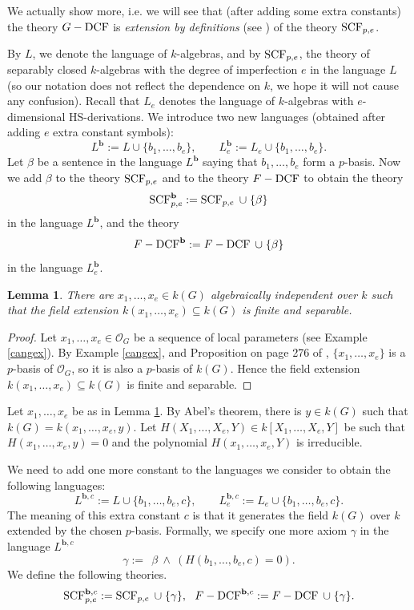 \documentclass[10pt]{amsart}
\newtheorem{lemma}[theorem]{Lemma}
\theoremstyle{definition}
\begin{document}
We actually show more, i.e. we will see that (after adding some extra constants) the theory $G-\operatorname{DCF}$ is \emph{extension by definitions} (see \cite[page 59]{shologic}) of the theory $\operatorname{SCF}_{p,e}$.

By $L$, we denote the language of $k$-algebras, and by $\operatorname{SCF}_{p,e}$, the theory of separably closed $k$-algebras with the degree of imperfection $e$
in the language $L$ (so our notation does not reflect the dependence on $k$, we hope it will not cause any confusion). Recall that $L_e$ denotes the language of $k$-algebras with $e$-dimensional HS-derivations. We introduce two new languages (obtained after adding $e$ extra constant symbols):
$$L^{\mathbf{b}}:=L\cup\lbrace b_1,\ldots,b_e\rbrace,\qquad L_e^{\mathbf{b}}:=L_e\cup\lbrace b_1,\ldots,b_e\rbrace.$$
Let $\beta$ be a sentence in the language $L^{\mathbf{b}}$ saying that $b_1,\ldots,b_e$ form a $p$-basis.
Now we add $\beta$ to the theory $\operatorname{SCF}_{p,e}$ and to the theory $F-\operatorname{DCF}$ to obtain the theory
$$\operatorname{SCF}_{p,e}^{\mathbf{b}}:=\operatorname{SCF}_{p,e}\;\cup\;\lbrace\beta\rbrace$$
in the language $L^{\mathbf{b}}$, and the theory
$$F-\operatorname{DCF}^{\mathbf{b}}:=F-\operatorname{DCF}\;\cup\;\lbrace\beta\rbrace$$
in the language $L_e^{\mathbf{b}}$.
\begin{lemma}\label{finsep}
There are $x_1,\ldots,x_e\in k(G)$ algebraically independent over $k$ such that the field extension $k(x_1,\ldots,x_e)\subseteq k(G)$ is finite and separable. %
\end{lemma}
\begin{proof}
Let $x_1,\ldots,x_e\in \mathcal{O}_G$ be a sequence of local parameters (see Example \ref{cangex}). By Example \ref{cangex}, \cite[30.6(ii)]{mat} and Proposition on page 276 of \cite{mat0}, $\{x_1,\ldots,x_e\}$ is a $p$-basis of $\mathcal{O}_G$, so it is also a $p$-basis of $k(G)$. Hence the field extension $k(x_1,\ldots,x_e)\subseteq k(G)$ is finite and separable.
\end{proof}
Let $x_1,\ldots,x_e$ be as in Lemma \ref{finsep}. By Abel's theorem, there is $y\in k(G)$ such that $k(G)=k(x_1,\ldots,x_e,y)$. Let $H(X_1,\ldots,X_e,Y)\in k[X_1,\ldots,X_e,Y]$ be such that $H(x_1,\ldots,x_e,y)=0$ and the polynomial $H(x_1,\ldots,x_e,Y)$ is irreducible.

We need to add one more constant to the languages we consider to obtain the following languages:
$$L^{{\mathbf{b}},c}:=L\cup\lbrace b_1,\ldots,b_e,c\rbrace,\qquad L_e^{{\mathbf{b}},c}:=L_e\cup\lbrace b_1,\ldots,b_e,c\rbrace.$$
The meaning of this extra constant $c$ is that it generates the field $k(G)$ over $k$ extended by the chosen $p$-basis.
Formally, we specify one more axiom $\gamma$ in the language $L^{{\mathbf{b}},c}$  
$$\gamma:=\ \ \beta \ \wedge  \ (H(b_1,\ldots,b_e,c)=0).$$
We define the following theories.
$$\operatorname{SCF}_{p,e}^{{\mathbf{b}},c}:=\operatorname{SCF}_{p,e}\;\cup\;\lbrace \gamma\rbrace,\ \ F-\operatorname{DCF}^{{\mathbf{b}},c}:=F-\operatorname{DCF}\;\cup\;\lbrace \gamma\rbrace .$$
\end{document}

